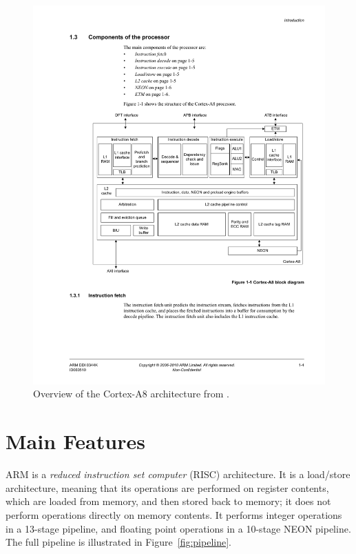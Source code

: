 \documentclass[oneside,a4paper]{report}
\begin{document}
\begin{figure}[htbp]
	\centering
	\includegraphics[width=1.0\textwidth]{./fig/CortexA8.pdf}
	\caption{Overview of the Cortex-A8 architecture from \cite[p. 1-4]{A8Ref}.}
	\label{fig:cortexa8}
\end{figure}

\chapter{Main Features}

ARM is a \emph{reduced instruction set computer} (RISC) architecture. It is a load/store architecture, meaning that its operations are performed on register contents, which are loaded from memory, and then stored back to memory; it does not perform operations directly on memory contents. It performs integer operations in a 13-stage pipeline, and floating point operations in a 10-stage NEON pipeline. The full pipeline is illustrated in Figure~\ref{fig:pipeline}.
\end{document}
